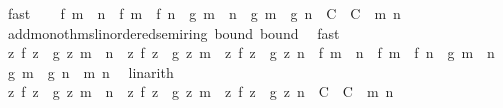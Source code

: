 \begin{isabellebody}
\ fast\isanewline
\ \ \isamarkupfalse%
\ {\isachardoublequoteopen}{\isasymbar}f\ {\isacharparenleft}{\kern0pt}m\ {\isacharplus}{\kern0pt}\ n{\isacharparenright}{\kern0pt}\ {\isacharminus}{\kern0pt}\ {\isacharparenleft}{\kern0pt}f\ m\ {\isacharplus}{\kern0pt}\ f\ n{\isacharparenright}{\kern0pt}{\isasymbar}\ {\isacharplus}{\kern0pt}\ {\isasymbar}g\ {\isacharparenleft}{\kern0pt}m\ {\isacharplus}{\kern0pt}\ n{\isacharparenright}{\kern0pt}\ {\isacharminus}{\kern0pt}\ {\isacharparenleft}{\kern0pt}g\ m\ {\isacharplus}{\kern0pt}\ g\ n{\isacharparenright}{\kern0pt}{\isasymbar}\ {\isasymle}\ C\ {\isacharplus}{\kern0pt}\ C{\isacharprime}{\kern0pt}{\isachardoublequoteclose}\ \ m\ n\ \isamarkupfalse%
\ add{\isacharunderscore}{\kern0pt}mono{\isacharunderscore}{\kern0pt}thms{\isacharunderscore}{\kern0pt}linordered{\isacharunderscore}{\kern0pt}semiring{\isacharparenleft}{\kern0pt}{}{\isacharparenright}{\kern0pt}\ bound\ bound{\isacharprime}{\kern0pt}\ \isamarkupfalse%
\ fast\isanewline
\ \ \isamarkupfalse%
\ \isamarkupfalse%
\ {\isachardoublequoteopen}{\isasymbar}{\isacharparenleft}{\kern0pt}{\isasymlambda}z{\isachardot}{\kern0pt}\ f\ z\ {\isacharplus}{\kern0pt}\ g\ z{\isacharparenright}{\kern0pt}\ {\isacharparenleft}{\kern0pt}m\ {\isacharplus}{\kern0pt}\ n{\isacharparenright}{\kern0pt}\ {\isacharminus}{\kern0pt}\ {\isacharparenleft}{\kern0pt}{\isacharparenleft}{\kern0pt}{\isasymlambda}z{\isachardot}{\kern0pt}\ f\ z\ {\isacharplus}{\kern0pt}\ g\ z{\isacharparenright}{\kern0pt}\ m\ {\isacharplus}{\kern0pt}\ {\isacharparenleft}{\kern0pt}{\isasymlambda}z{\isachardot}{\kern0pt}\ f\ z\ {\isacharplus}{\kern0pt}\ g\ z{\isacharparenright}{\kern0pt}\ n{\isacharparenright}{\kern0pt}{\isasymbar}\ {\isasymle}\ {\isasymbar}f\ {\isacharparenleft}{\kern0pt}m\ {\isacharplus}{\kern0pt}\ n{\isacharparenright}{\kern0pt}\ {\isacharminus}{\kern0pt}\ {\isacharparenleft}{\kern0pt}f\ m\ {\isacharplus}{\kern0pt}\ f\ n{\isacharparenright}{\kern0pt}{\isasymbar}\ {\isacharplus}{\kern0pt}\ {\isasymbar}g\ {\isacharparenleft}{\kern0pt}m\ {\isacharplus}{\kern0pt}\ n{\isacharparenright}{\kern0pt}\ {\isacharminus}{\kern0pt}\ {\isacharparenleft}{\kern0pt}g\ m\ {\isacharplus}{\kern0pt}\ g\ n{\isacharparenright}{\kern0pt}{\isasymbar}{\isachardoublequoteclose}\ \ m\ n\ \isamarkupfalse%
\ linarith\isanewline
\ \ \isamarkupfalse%
\ \isamarkupfalse%
\ {\isachardoublequoteopen}{\isasymbar}{\isacharparenleft}{\kern0pt}{\isasymlambda}z{\isachardot}{\kern0pt}\ f\ z\ {\isacharplus}{\kern0pt}\ g\ z{\isacharparenright}{\kern0pt}\ {\isacharparenleft}{\kern0pt}m\ {\isacharplus}{\kern0pt}\ n{\isacharparenright}{\kern0pt}\ {\isacharminus}{\kern0pt}\ {\isacharparenleft}{\kern0pt}{\isacharparenleft}{\kern0pt}{\isasymlambda}z{\isachardot}{\kern0pt}\ f\ z\ {\isacharplus}{\kern0pt}\ g\ z{\isacharparenright}{\kern0pt}\ m\ {\isacharplus}{\kern0pt}\ {\isacharparenleft}{\kern0pt}{\isasymlambda}z{\isachardot}{\kern0pt}\ f\ z\ {\isacharplus}{\kern0pt}\ g\ z{\isacharparenright}{\kern0pt}\ n{\isacharparenright}{\kern0pt}{\isasymbar}\ {\isasymle}\ C\ {\isacharplus}{\kern0pt}\ C{\isacharprime}{\kern0pt}{\isachardoublequoteclose}\ \ m\ n\ \isamarkupfalse%

\end{isabellebody}
